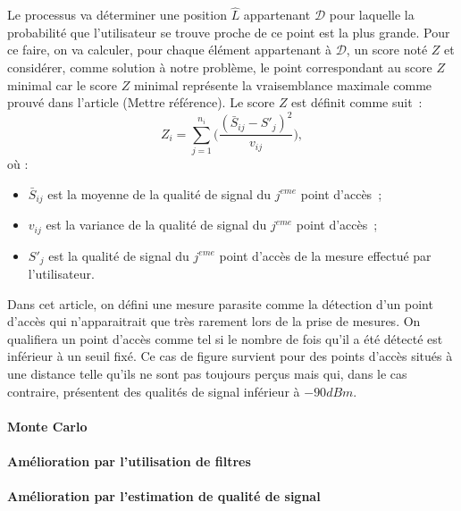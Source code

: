 \documentclass[11pt,journal,compsoc]{IEEEtran}
\begin{document}
        Le processus va déterminer une position $\hat{L}$ appartenant $\mathcal{D}$ pour laquelle la probabilité que l'utilisateur se trouve proche de ce point est la plus grande.
		Pour ce faire, on va calculer, pour chaque élément appartenant à $\mathcal{D}$, un score noté $Z$ et considérer, comme solution à notre problème, le point correspondant
		au score $Z$ minimal car le score $Z$ minimal représente la vraisemblance maximale comme prouvé dans l'article (Mettre référence). Le score $Z$ est définit comme suit~:
        \begin{equation}
          Z_{i} = \sum\limits_{j = 1}^{n_{i}}\bigg(\frac{(\bar{S}_{ij}-S'_{j})^{2}}{v_{ij}}\bigg),
        \end{equation}
        où :
        \begin{itemize}
          \item $\bar{S}_{ij}$ est la moyenne de la qualité de signal du $j^{eme}$ point d'accès~;
          \item $v_{ij}$ est la variance de la qualité de signal du $j^{eme}$ point d'accès~;
          \item $S'_{j}$ est la qualité de signal du $j^{eme}$ point d'accès de la mesure effectué par l'utilisateur.
        \end{itemize}

        \begin{tcolorbox}[title = Mesures parasites]
          Dans cet article, on défini une mesure parasite comme la détection d'un point d'accès qui n'apparaitrait que très rarement lors de la prise de mesures. On qualifiera
		  un point d'accès comme tel si le nombre de fois qu'il a été détecté est inférieur à un seuil fixé.
          Ce cas de figure survient pour des points d'accès situés à une distance telle qu'ils ne sont pas toujours perçus mais qui, dans le cas contraire, présentent des qualités
		  de signal inférieur à $-90 dBm$.
        \end{tcolorbox}

      \paragraph{Monte Carlo}
      \paragraph{Amélioration par l'utilisation de filtres}
      \paragraph{Amélioration par l'estimation de qualité de signal}
\end{document}
